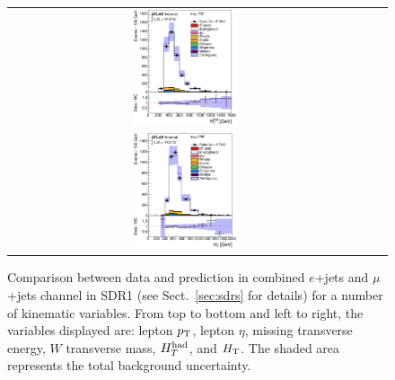 \begin{figure}[h!]
\begin{center}
\begin{tabular}{ccc}
\includegraphics[width=0.30\textwidth]{appendices/figures/sdrs/HTHad_ELEMUONCR5_1W_NOMINAL.eps}  \\
\includegraphics[width=0.30\textwidth]{appendices/figures/sdrs/HTAll_ELEMUONCR5_1W_NOMINAL.eps}  &  &\\
\end{tabular}\caption{\small {Comparison between data and prediction in combined $e$+jets and $\mu$+jets channel in SDR1 (see Sect.~\ref{sec:sdrs} for details) 
for a number of kinematic variables. From top to bottom and left to right, the variables displayed are: lepton $\pt$, lepton $\eta$, missing transverse energy, $W$ transverse mass,
$\hthad$, and $\HT$. The shaded area represents the total background uncertainty.}}
\label{fig:ELEMUONCR5_1}
\end{center}
\end{figure}                                                                             

